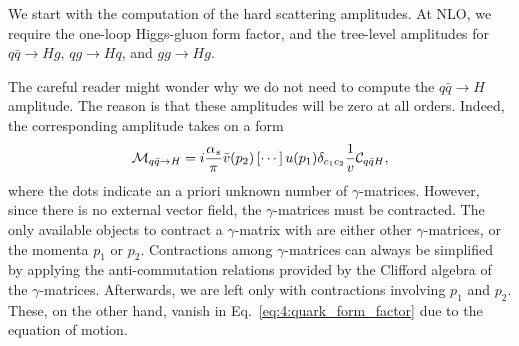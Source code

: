We start with the computation of the hard scattering amplitudes. At \acs{NLO}, we require the one-loop Higgs-gluon form factor, and the tree-level amplitudes for $q \bar{q} \rightarrow H g$, $q g \rightarrow H q$, and $g g \rightarrow H g$.

The careful reader might wonder why we do not need to compute the $q \bar{q} \rightarrow H$ amplitude. The reason is that these amplitudes will be zero at all orders. Indeed, the corresponding amplitude takes on a form
\begin{equation}
\mathcal{M}_{q \bar{q} \rightarrow H} = i \frac{\alpha_s}{\pi} \bar{v}(p_2) \left[ \cdots \right] u(p_1) \delta_{c_1 c_2} \frac{1}{v} \mathcal{C}_{q \bar{q} H},
\label{eq:4:quark_form_factor}
\end{equation}
where the dots indicate an a priori unknown number of $\gamma$-matrices. However, since there is no external vector field, the $\gamma$-matrices must be contracted. The only available objects to contract a $\gamma$-matrix with are either other $\gamma$-matrices, or the momenta $p_1$ or $p_2$. Contractions among $\gamma$-matrices can always be simplified by applying the anti-commutation relations provided by the Clifford algebra of the $\gamma$-matrices. Afterwards, we are left only with contractions involving $p_1$ and $p_2$. These, on the other hand, vanish in Eq.~\eqref{eq:4:quark_form_factor} due to the equation of motion.

